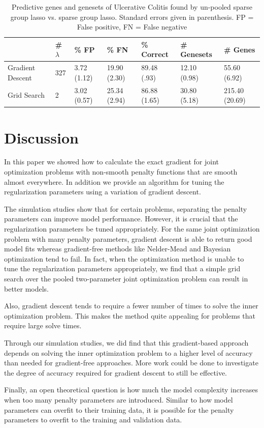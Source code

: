 \documentclass[12pt]{article}
\begin{document}
\begin{table}
\caption{\label{colitis} Predictive genes and genesets of Ulcerative Colitis found by un-pooled sparse group lasso vs. sparse group lasso. Standard errors given in parenthesis. FP = False positive, FN = False negative}
\centering
\begin{tabular}{| l |l |l | l | l | l | l | }
\hline
& \# $\lambda$ & \% FP & \% FN & \% Correct  & \# Genesets & \# Genes  \\
\hline
Gradient Descent & 327 & 3.72 (1.12) & 19.90 (2.30) & 89.48 (.93) & 12.10 (0.98) & 55.60 (6.92) \\
\hline
Grid Search & 2 & 3.02 (0.57) & 25.34 (2.94)  & 86.88 (1.65) & 30.80 (5.18) & 215.40 (20.69) \\
\hline
\end{tabular}
\end{table}

\section{Discussion}
In this paper we showed how to calculate the exact gradient for joint optimization problems with non-smooth penalty functions that are smooth almost everywhere. In addition we provide an algorithm for tuning the regularization parameters using a variation of gradient descent. 

The simulation studies show that for certain problems, separating the penalty parameters can improve model performance. However, it is crucial that the regularization parameters be tuned appropriately. For the same joint optimization problem with many penalty parameters, gradient descent is able to return good model fits whereas gradient-free methods like Nelder-Mead and Bayesian optimization tend to fail. In fact, when the optimization method is unable to tune the regularization parameters appropriately, we find that a simple grid search over the pooled two-parameter joint optimization problem can result in better models.

Also, gradient descent tends to require a fewer number of times to solve the inner optimization problem. This makes the method quite appealing for problems that require large solve times. 

Through our simulation studies, we did find that this gradient-based approach depends on solving the inner optimization problem to a higher level of accuracy than needed for gradient-free approaches. More work could be done to investigate the degree of accuracy required for gradient descent to still be effective.

Finally, an open theoretical question is how much the model complexity increases when too many penalty parameters are introduced. Similar to how model parameters can overfit to their training data, it is possible for the penalty parameters to overfit to the training and validation data.

\bigskip



\end{document}
